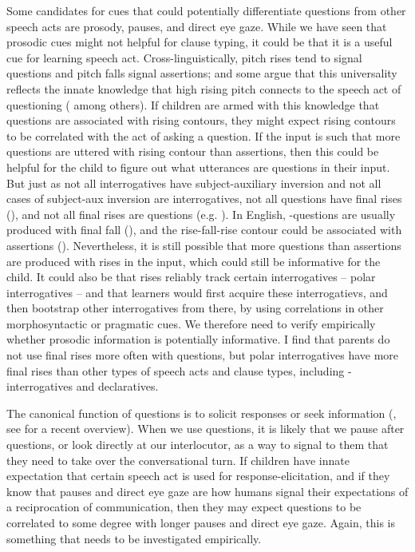 Some candidates for cues that could potentially differentiate questions from other speech acts are prosody, pauses, and direct eye gaze. While we have seen that prosodic cues might not helpful for clause typing, it could be that it is a useful cue for learning speech act. Cross-linguistically, pitch rises tend to signal questions and pitch falls signal assertions; and some argue that this universality reflects the innate knowledge that high rising pitch connects to the speech act of questioning (\cite{ohala1984,gussenhovenchen2000,gussenhoven2002} among others). If children are armed with this knowledge that questions are associated with rising contours, they might expect rising contours to be correlated with the act of asking a question. If the input is such that more questions are uttered with rising contour than assertions, then this could be helpful for the child to figure out what utterances are  questions in their input. But just as not all interrogatives have subject-auxiliary inversion and not all cases of subject-aux inversion are interrogatives, not all questions have final rises (\cite{bartels1999prosody, gussenhoven2000fallq, hedberg2004wh,ladd2008intonational}), and not all final rises are questions (e.g. \cite{bartels1999prosody, gordon1999prosody,ladd1981, ward1985rfr,goodhue2016prosody}). In English, \twh-questions are usually produced with final fall (\cite{hedberg2004wh,ladd2008intonational}), and the rise-fall-rise contour could be associated with assertions (\cite{ladd1981, ward1985rfr,goodhue2016prosody}). Nevertheless, it is still possible that more questions than assertions are produced with rises in the input, which could still be informative for the child. It could also be that rises reliably track certain interrogatives -- polar interrogatives -- and that learners would first acquire these interrogatievs, and then bootstrap other interrogatives from there, by using correlations in other morphosyntactic or pragmatic cues. We therefore need to verify empirically whether prosodic information is potentially informative. I find that parents do not use final rises more often with questions, but polar interrogatives have more final rises than other types of speech acts and clause types, including \twh-interrogatives and declaratives. 

The canonical function of questions is to solicit responses or seek information (\citealt{searle1975tax,levinson1983,stivers2010}, see \citealt{krifka2011q} for a recent overview). When we use questions, it is likely that we pause after questions, or look directly at our interlocutor, as a way to signal to them that they need to take over the conversational turn. If children have innate expectation that certain speech act is used for response-elicitation, and if they know that pauses and direct eye gaze are how humans signal their expectations of a reciprocation of communication, then they may expect questions to be correlated to some degree with longer pauses and direct eye gaze. Again, this is something that needs to be investigated empirically.

